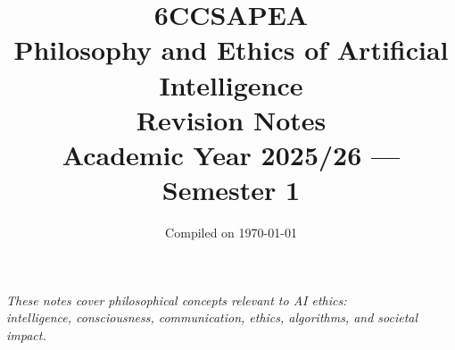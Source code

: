 \documentclass[10pt]{article}
\title{%
  \vspace{-1cm}
  {\LARGE\bfseries 6CCSAPEA}\\[0.3cm]
  {\Huge Philosophy and Ethics of Artificial Intelligence}\\[0.5cm]
  {\Large Revision Notes}\\[0.3cm]
  {\large Academic Year 2025/26 --- Semester 1}
}
\author{}
\date{\vspace{-0.5cm}Compiled on \today}
\begin{document}
\maketitle
\thispagestyle{empty}

\vfill
\begin{center}
\textit{These notes cover philosophical concepts relevant to AI ethics:\\
intelligence, consciousness, communication, ethics, algorithms, and societal impact.}
\end{center}
\vfill

\clearpage
\tableofcontents

\clearpage



\clearpage


\clearpage


\clearpage


\clearpage


\clearpage


\clearpage


\clearpage


\clearpage


\clearpage

\end{document}
